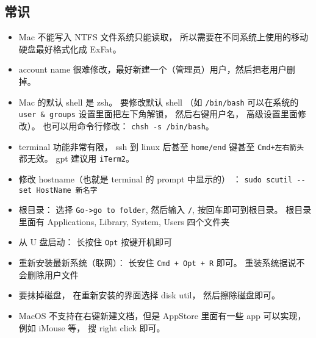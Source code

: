 \subsection{常识}
\begin{itemize}
\item Mac 不能写入 NTFS 文件系统只能读取， 所以需要在不同系统上使用的移动硬盘最好格式化成 ExFat。
\item account name 很难修改，最好新建一个（管理员）用户，然后把老用户删掉。
\item Mac 的默认 shell 是 zsh。 要修改默认 shell （如 \verb`/bin/bash` 可以在系统的 \verb`user & groups` 设置里面把左下角解锁， 然后右键用户名， 高级设置里面修改）。 也可以用命令行修改： \verb`chsh -s /bin/bash`。
\item terminal 功能非常有限， ssh 到 linux 后甚至 \verb`home/end` 键甚至 \verb`Cmd+左右箭头` 都无效。 gpt 建议用 \verb`iTerm2`。
\item 修改 hostname（也就是 terminal 的 prompt 中显示的） ： \verb`sudo scutil --set HostName 新名字`
\item 根目录： 选择 \verb`Go->go to folder`, 然后输入 \verb`/`, 按回车即可到根目录。 根目录里面有 Applications, Library, System, Users 四个文件夹
\item 从 U 盘启动： 长按住 \verb`Opt` 按键开机即可
\item 重新安装最新系统（联网）： 长安住 \verb`Cmd + Opt + R` 即可。 重装系统据说不会删除用户文件
\item 要抹掉磁盘， 在重新安装的界面选择 disk util， 然后擦除磁盘即可。
\item MacOS 不支持在右键新建文档，但是 AppStore 里面有一些 app 可以实现， 例如 iMouse 等， 搜 right click 即可。
\end{itemize}

